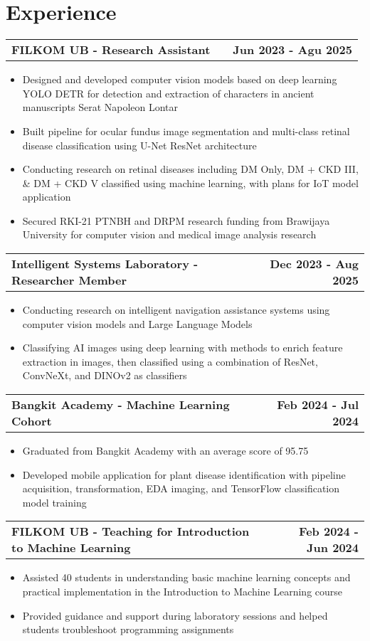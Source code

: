 \documentclass[a4paper,12pt]{article}
\makeatletter
\newenvironment{joblong}[2]
    {
    \begin{tabularx}{\linewidth}{@{}l X r@{}}
    \textbf{#1} & \hfill &  #2 \\[3.75pt]
    \end{tabularx}
    \begin{minipage}[t]{\linewidth}
    \begin{itemize}[nosep,after=\strut, leftmargin=1em, itemsep=3pt,label=--]
    }
    {
    \end{itemize}
    \end{minipage}    
    }
\makeatother
\begin{document}
\section{Experience}

\begin{joblong}{FILKOM UB - Research Assistant}{\textbf{Jun 2023 - Agu 2025}}
\item Designed and developed computer vision models based on deep learning YOLO DETR for detection and extraction of characters in ancient manuscripts Serat Napoleon Lontar
\item Built pipeline for ocular fundus image segmentation and multi-class retinal disease classification using U-Net ResNet architecture
\item Conducting research on retinal diseases including DM Only, DM + CKD III, \& DM + CKD V classified using machine learning, with plans for IoT model application
\item Secured RKI-21 PTNBH and DRPM research funding from Brawijaya University for computer vision and medical image analysis research
\end{joblong}

\begin{joblong}{Intelligent Systems Laboratory - Researcher Member}{\textbf{Dec 2023 - Aug 2025}}
\item Conducting research on intelligent navigation assistance systems using computer vision models and Large Language Models
\item Classifying AI images using deep learning with methods to enrich feature extraction in images, then classified using a combination of ResNet, ConvNeXt, and DINOv2 as classifiers
\end{joblong}

\begin{joblong}{Bangkit Academy - Machine Learning Cohort}{\textbf{Feb 2024 - Jul 2024}}
\item Graduated from Bangkit Academy with an average score of 95.75
\item Developed mobile application for plant disease identification with pipeline acquisition, transformation, EDA imaging, and TensorFlow classification model training
\end{joblong}

\begin{joblong}{FILKOM UB - Teaching for Introduction to Machine Learning}{\textbf{Feb 2024 - Jun 2024}}
\item Assisted 40 students in understanding basic machine learning concepts and practical implementation in the Introduction to Machine Learning course
\item Provided guidance and support during laboratory sessions and helped students troubleshoot programming assignments
\end{joblong}
\end{document}

